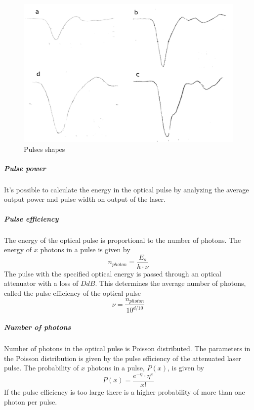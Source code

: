 \begin{figure}
  \centering
  \includegraphics[scale=0.1]{LasPOsc}
  \caption{Pulses shapes}
  \label{fig:LasPOsc}
\end{figure}

\subparagraph{Pulse power}

It's possible to calculate the energy in the optical pulse by
analyzing the average output power and pulse width on output of the
laser.

\subparagraph{Pulse efficiency}

The energy of the optical pulse is proportional to the number of
photons.  The energy of $x$ photons in a pulse is given by
\begin{equation}
  n_{photon}=\frac{E_{o}}{h\cdot\nu}
\end{equation}
The pulse with the specified optical energy is passed through an
optical attenuator with a loss of $D dB$.  This determines the average
number of photons, called the pulse efficiency of the optical pulse
\begin{equation}
  \nu=\frac{n_{photon}}{10^{d/10}}
\end{equation}


\subparagraph{Number of photons}

Number of photons in the optical pulse is Poisson distributed. The
parameters in the Poisson distribution is given by the pulse
efficiency of the attenuated laser pulse. The probability of $x$
photons in a pulse, $P(x)$, is given by
\begin{equation}
  P(x)= \frac{e^{-\eta}\cdot{\eta^x}}{x!}
\end{equation}
If the pulse efficiency is too large there is a higher probability of
more than one photon per pulse.

